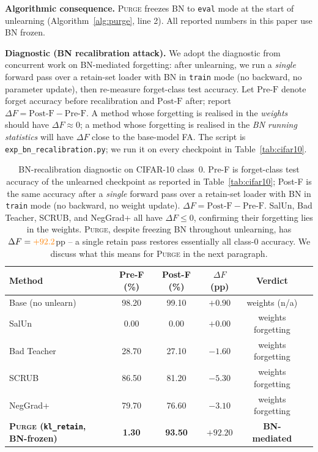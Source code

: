 \documentclass{article}
\newcommand{\ours}{\textsc{Purge}}
\newcommand{\klr}{\texttt{kl\_retain}}
\newcommand{\new}[1]{{\color{orange}#1}}
\begin{document}
{\textbf{Algorithmic consequence.} \ours{} freezes BN to \texttt{eval} mode at the start of unlearning (Algorithm~\ref{alg:purge}, line 2). All reported numbers in this paper use BN frozen.

\textbf{Diagnostic (BN recalibration attack).} We adopt the diagnostic from concurrent work on BN-mediated forgetting: after unlearning, we run a \emph{single} forward pass over a retain-set loader with BN in \texttt{train} mode (no backward, no parameter update), then re-measure forget-class test accuracy. Let $\mathrm{Pre\text{-}F}$ denote forget accuracy before recalibration and $\mathrm{Post\text{-}F}$ after; report $\Delta F = \mathrm{Post\text{-}F} - \mathrm{Pre\text{-}F}$. A method whose forgetting is realised in the \emph{weights} should have $\Delta F \approx 0$; a method whose forgetting is realised in the \emph{BN running statistics} will have $\Delta F$ close to the base-model FA. The script is \texttt{exp\_bn\_recalibration.py}; we run it on every checkpoint in Table~\ref{tab:cifar10}.

\begin{table}[t]
\centering
\small
\begin{tabular}{lccccc}
\toprule
\textbf{Method} & \textbf{Pre-F (\%)} & \textbf{Post-F (\%)} & $\Delta F$ \textbf{(pp)} & \textbf{Verdict} \\
\midrule
Base (no unlearn) & 98.20 & 99.10 & $+0.90$ & weights (n/a) \\
SalUn             &  0.00 &  0.00 & $+0.00$ & weights forgetting \\
Bad Teacher       & 28.70 & 27.10 & $-1.60$ & weights forgetting \\
SCRUB             & 86.50 & 81.20 & $-5.30$ & weights forgetting \\
NegGrad+          & 79.70 & 76.60 & $-3.10$ & weights forgetting \\
\textbf{\ours{} (\klr{}, BN-frozen)} & \new{\textbf{1.30}} & \new{\textbf{93.50}} & \new{$\boldsymbol{+92.20}$} & \textbf{BN-mediated} \\
\bottomrule
\end{tabular}
\caption{BN-recalibration diagnostic on CIFAR-10 class~0. Pre-F is forget-class test accuracy of the unlearned checkpoint as reported in Table~\ref{tab:cifar10}; Post-F is the same accuracy after a \emph{single} forward pass over a retain-set loader with BN in \texttt{train} mode (no backward, no weight update). $\Delta F = \mathrm{Post\text{-}F} - \mathrm{Pre\text{-}F}$. SalUn, Bad Teacher, SCRUB, and NegGrad+ all have $\Delta F \le 0$, confirming their forgetting lies in the weights. \ours{}, despite freezing BN throughout unlearning, has $\Delta F = \new{+92.2}$pp -- a single retain pass restores essentially all class-0 accuracy. We discuss what this means for \ours{} in the next paragraph.}
\label{tab:bn_recal}
\end{table}

}
\end{document}
